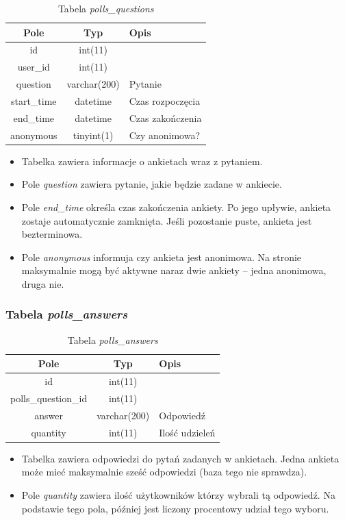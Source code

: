 \documentclass[a4paper,12pt,oneside]{report}
\begin{document}
\begin{table}[h]
  \centering
  \begin{tabular}{|c|c|l|}\hline
  Pole & Typ & Opis \\\hline
  id          & int(11)      & \\
  user\_id    & int(11)      & \\
  question    & varchar(200) & Pytanie \\
  start\_time & datetime     & Czas rozpoczęcia \\
  end\_time   & datetime     & Czas zakończenia \\
  anonymous   & tinyint(1)   & Czy anonimowa? \\\hline

  \end{tabular}
  \caption{Tabela \emph{polls\_questions}\label{tab:polls_questions}}
\end{table}
\begin{itemize}
  \item Tabelka zawiera informacje o ankietach wraz z pytaniem.
  \item Pole \emph{question} zawiera pytanie, jakie będzie zadane w ankiecie.
  \item Pole \emph{end\_time} określa czas zakończenia ankiety. Po jego upływie, ankieta zostaje automatycznie zamknięta. Jeśli pozostanie puste, ankieta jest bezterminowa.
  \item Pole \emph{anonymous} informuja czy ankieta jest anonimowa. Na stronie maksymalnie mogą być aktywne naraz dwie ankiety -- jedna anonimowa, druga nie.
\end{itemize}

\subsubsection{Tabela \emph{polls\_answers}}
\label{subsub:polls_answers}

\begin{table}[h]
  \centering
  \begin{tabular}{|c|c|l|}\hline
  Pole & Typ & Opis \\\hline
  id          & int(11)      & \\
  polls\_question\_id & int(11)      & \\
  answer              & varchar(200) & Odpowiedź \\
  quantity            & int(11)      & Ilość udzieleń \\\hline
  \end{tabular}
  \caption{Tabela \emph{polls\_answers}\label{tab:polls_answers}}
\end{table}
\begin{itemize}
  \item Tabelka zawiera odpowiedzi do pytań zadanych w ankietach. Jedna ankieta może mieć maksymalnie sześć odpowiedzi (baza tego nie sprawdza).
  \item Pole \emph{quantity} zawiera ilość użytkowników którzy wybrali tą odpowiedź. Na podstawie tego pola, później jest liczony procentowy udział tego wyboru.
\end{itemize}
\end{document}
